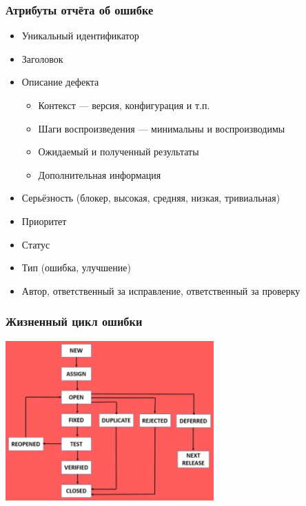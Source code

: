\documentclass{../../slides-style}
\begin{document}
    \begin{frame}
        \frametitle{Атрибуты отчёта об ошибке}
        \begin{itemize}
            \item Уникальный идентификатор
            \item Заголовок
            \item Описание дефекта
            \begin{itemize}
                \item Контекст --- версия, конфигурация и т.п.
                \item Шаги воспроизведения --- минимальны и воспроизводимы
                \item Ожидаемый и полученный результаты
                \item Дополнительная информация
            \end{itemize}
            \item Серьёзность (блокер, высокая, средняя, низкая, тривиальная)
            \item Приоритет
            \item Статус
            \item Тип (ошибка, улучшение)
            \item Автор, ответственный за исправление, ответственный за проверку
        \end{itemize}
    \end{frame}

    \begin{frame}
        \frametitle{Жизненный цикл ошибки}
        \begin{center}
            \includegraphics[width=0.6\textwidth]{bugLifecycle1.png}
        \end{center}
    \end{frame}
\end{document}
